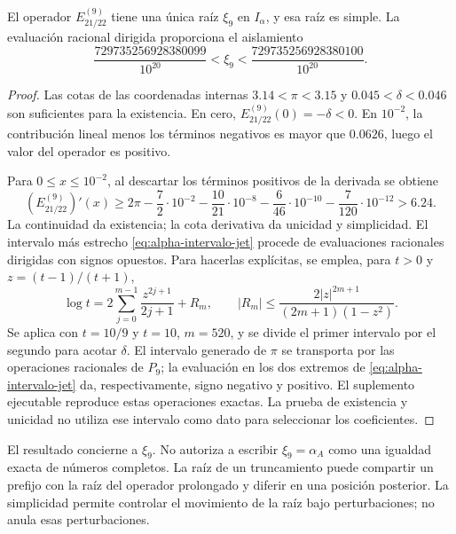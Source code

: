 \begin{proposition}
\label{prop:alpha-raiz-jet}
El operador \(E_{21/22}^{(9)}\) tiene una única raíz
\(\xi_9\) en \(I_\alpha\), y esa raíz es simple. La evaluación racional dirigida proporciona el aislamiento
\begin{equation}
 \frac{729735256928380099}{10^{20}}
 <\xi_9<\frac{729735256928380100}{10^{20}}.
 \label{eq:alpha-intervalo-jet}
\end{equation}
\end{proposition}

\begin{proof}
Las cotas de las coordenadas internas
\(3.14<\pi<3.15\) y
\(0.045<\delta<0.046\) son suficientes para la existencia. En cero,
\(E_{21/22}^{(9)}(0)=-\delta<0\). En \(10^{-2}\), la contribución
lineal menos los términos negativos es mayor que \(0.0626\), luego el
valor del operador es positivo.

Para \(0\leq x\leq10^{-2}\), al descartar los términos positivos de
la derivada se obtiene
\[
 (E_{21/22}^{(9)})'(x)
 \geq2\pi-\frac72\cdot10^{-2}
 -\frac{10}{21}\cdot10^{-8}-\frac6{46}\cdot10^{-10}
 -\frac7{120}\cdot10^{-12}>6.24.
\]
La continuidad da existencia; la cota derivativa da unicidad y
simplicidad. El intervalo más estrecho
\eqref{eq:alpha-intervalo-jet} procede de evaluaciones racionales dirigidas con signos opuestos. Para hacerlas
explícitas, se emplea, para \(t>0\) y \(z=(t-1)/(t+1)\),
\[
 \log t=2\sum_{j=0}^{m-1}\frac{z^{2j+1}}{2j+1}+R_m,
 \qquad |R_m|\leq\frac{2|z|^{2m+1}}{(2m+1)(1-z^2)}.
\]
Se aplica con \(t=10/9\) y \(t=10\), \(m=520\), y se divide
el primer intervalo por el segundo para acotar \(\delta\). El intervalo
generado de \(\pi\) se transporta por las operaciones racionales de
\(P_9\); la evaluación en los dos extremos de
\eqref{eq:alpha-intervalo-jet} da, respectivamente, signo negativo y
positivo. El suplemento ejecutable reproduce estas operaciones exactas.
La prueba de existencia y unicidad no utiliza ese intervalo como dato
para seleccionar los coeficientes.
\end{proof}

El resultado concierne a \(\xi_9\). No autoriza a escribir
\(\xi_9=\alpha_A\) como una igualdad exacta de números completos.
La raíz de un truncamiento puede compartir un prefijo con la raíz del
operador prolongado y diferir en una posición posterior. La simplicidad
permite controlar el movimiento de la raíz bajo perturbaciones; no
anula esas perturbaciones.


